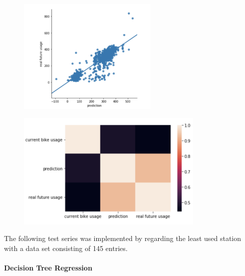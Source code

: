 \begin{figure}[H]
\centering
\includegraphics[width=0.6\textwidth]{media/image34}\label{fig:image34}
\label{fig:image34}
\end{figure}
\begin{figure}[H]
\centering
\includegraphics[width=0.8\textwidth]{media/image35}\label{fig:image35}
\label{fig:image35}
\end{figure}
The following test series was implemented by regarding the least used station with a data set consisting of 145 entries.\\\\
\textbf{Decision Tree Regression}\\

